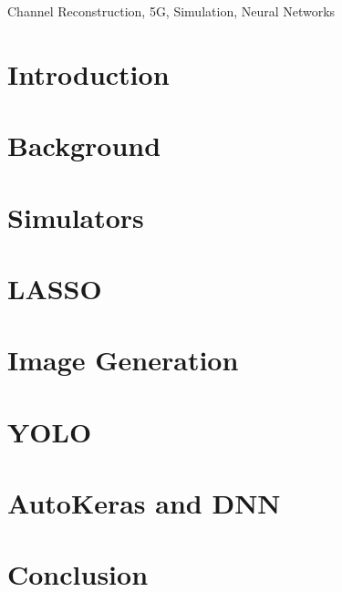 \documentclass[conference, compsoc, onecolumn]{IEEEtran}
\begin{document}
\begin{IEEEkeywords}
Channel Reconstruction, 5G, Simulation, Neural Networks
\end{IEEEkeywords}

\section{Introduction}


\section{Background} \label{background}


\section{Simulators} \label{sim}


\section{LASSO} \label{lasso-main}


\section{Image Generation} \label{image-gen}


\section{YOLO} \label{yolo-main}


\section{AutoKeras and DNN} \label{autodnn}



\section{Conclusion}


\newpage


\end{document}
